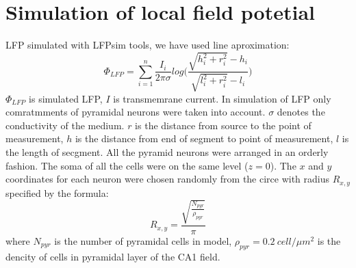\documentclass[a4paper,12pt]{article}
\begin{document}
\section{Simulation of local field potetial} \label{field_potetial_model}
LFP simulated with LFPsim tools, we have used line aproximation:
\begin{equation} 
\Phi_{LFP} = \sum^{n}_{i=1}{ \frac{I_i}{2\pi \sigma}log \Big(\frac{\sqrt{h_i^2 + r_i^2}-h_i}{\sqrt{l_i^2 + r_i^2}-l_i} } \Big)
\end{equation}
$\Phi_{LFP}$ is simulated LFP, $I$ is transmemrane current.
In simulation of LFP only comratmments of pyramidal neurons were taken into account. $\sigma$ denotes
the conductivity of the medium. $r$ is the distance from
source to the point of measurement, $h$ is the distance from end of segment to point of measurement, $l$ is the length of secgment. All the pyramid neurons were arranged in an orderly fashion. The soma of all the cells were on the same level ($z=0$). The $x$ and $y$ coordinates for each neuron were chosen randomly from the circe with radius $R_{x, y}$ specified by the formula:
\begin{equation} 
R_{x, y} = \frac{\sqrt{\frac{N_{pyr}}{\rho_{pyr}} }} {\pi}
\end{equation}
where $N_{pyr}$ is the number of pyramidal cells in model, $\rho_{pyr} = 0.2 \ cell/\mu m^2$ is the dencity of cells in pyramidal layer of the CA1 field.
\end{document}
